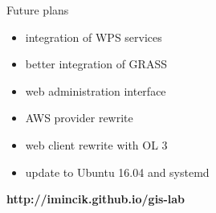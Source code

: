 \documentclass[12pt]{beamer}
\begin{document}
\begin{frame}{Future plans}
	\begin{itemize}
		\item integration of WPS services
		\item better integration of GRASS
		\item web administration interface
		\item AWS provider rewrite
		\item web client rewrite with OL 3
		\item update to Ubuntu 16.04 and systemd
	\end{itemize}
\end{frame}

\begin{frame}
	\begin{center}
		\textbf{http://imincik.github.io/gis-lab}
	\end{center}
\end{frame}


\end{document}
